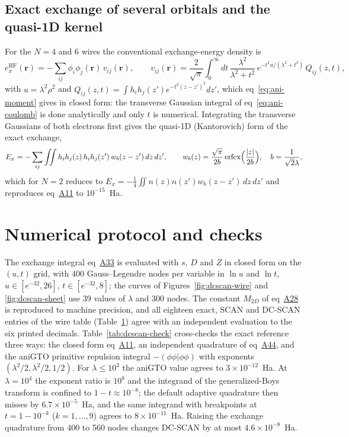 \documentclass[journal=jctcce,manuscript=suppinfo]{achemso}
\begin{document}
\subsection{Exact exchange of several orbitals and the quasi-1D kernel}
For the $N=4$ and 6 wires the conventional exchange-energy density is
\begin{equation}
e_x^{\mathrm{HF}}(\mathbf r)=-\sum_{ij}\phi_i\phi_j(\mathbf r)\,v_{ij}(\mathbf r),\qquad
v_{ij}(\mathbf r)=\frac{2}{\sqrt\pi}\int_0^\infty dt\,
\frac{\lambda^2}{\lambda^2+t^2}\,e^{-t^2u/(\lambda^2+t^2)}\,Q_{ij}(z,t),
\label{eq:ani-eed}
\end{equation}
with $u=\lambda^2\rho^2$ and $Q_{ij}(z,t)=\int h_ih_j(z')e^{-t^2(z-z')^2}dz'$,
which eq~\ref{eq:ani-moment} gives in closed form: the transverse Gaussian
integral of eq~\ref{eq:ani-coulomb} is done analytically and only $t$ is
numerical.  Integrating the transverse Gaussians of both electrons first gives
the quasi-1D (Kantorovich) form of the exact exchange,
\begin{equation}
E_x=-\sum_{ij}\iint h_ih_j(z)\,h_ih_j(z')\,w_b(z-z')\,dz\,dz',\qquad
w_b(z)=\frac{\sqrt\pi}{2b}\,\mathrm{erfcx}\Bigl(\frac{|z|}{2b}\Bigr),\quad b=\frac{1}{\sqrt2\lambda},
\label{eq:ani-kantorovich}
\end{equation}
which for $N=2$ reduces to $E_x=-\tfrac14\iint n(z)n(z')w_b(z-z')\,dz\,dz'$ and
reproduces eq~\href{main.pdf\#equation.11}{A11} to $10^{-15}$~Ha.

\section{Numerical protocol and checks}
\label{sec:dcscan-protocol}
The exchange integral eq~\href{main.pdf\#equation.33}{A33} is evaluated with $s$, $D$ and $Z$
in closed form on the $(u,t)$ grid, with 400 Gauss--Legendre nodes per
variable in $\ln u$ and $\ln t$, $u\in[e^{-32},26]$, $t\in[e^{-32},8]$; the
curves of Figures~\ref{fig:dcscan-wire} and \ref{fig:dcscan-sheet} use 39
values of $\lambda$ and 300 nodes.  The constant $M_{2D}$ of
eq~\href{main.pdf\#equation.28}{A28} is reproduced to machine precision, and all eighteen
exact, SCAN and DC-SCAN entries of the wire table (Table~\href{main.pdf\#table.1}{1})
agree with an independent evaluation to the six printed decimals.
Table~\ref{tab:dcscan-check} cross-checks the exact reference three ways: the
closed form eq~\href{main.pdf\#equation.11}{A11}, an independent quadrature of
eq~\href{main.pdf\#equation.44}{A44}, and the aniGTO primitive repulsion integral
$-(\phi\phi|\phi\phi)$ with exponents $(\lambda^2/2,\lambda^2/2,1/2)$.  For
$\lambda\le10^3$ the aniGTO value agrees to $3\times10^{-12}$~Ha.  At
$\lambda=10^4$ the exponent ratio is $10^8$ and the integrand of the
generalized-Boys transform is confined to $1-t\approx10^{-8}$; the default
adaptive quadrature then misses by $6.7\times10^{-5}$~Ha, and the same
integrand with breakpoints at $t=1-10^{-k}$ ($k=1,\dots,9$) agrees to
$8\times10^{-11}$~Ha.  Raising the exchange quadrature from 400 to 560 nodes
changes DC-SCAN by at most $4.6\times10^{-8}$~Ha.
\end{document}
